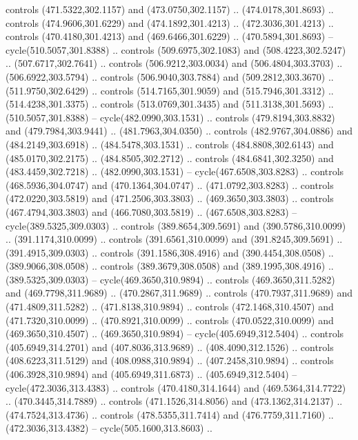 \begin{scope}[cm={{1.25,0.0,0.0,-1.25,(0.0,743.43331)}}]
    controls (471.5322,302.1157) and (473.0750,302.1157) .. (474.0178,301.8693) ..
    controls (474.9606,301.6229) and (474.1892,301.4213) .. (472.3036,301.4213) ..
    controls (470.4180,301.4213) and (469.6466,301.6229) .. (470.5894,301.8693) --
    cycle(510.5057,301.8388) .. controls (509.6975,302.1083) and
    (508.4223,302.5247) .. (507.6717,302.7641) .. controls (506.9212,303.0034) and
    (506.4804,303.3703) .. (506.6922,303.5794) .. controls (506.9040,303.7884) and
    (509.2812,303.3670) .. (511.9750,302.6429) .. controls (514.7165,301.9059) and
    (515.7946,301.3312) .. (514.4238,301.3375) .. controls (513.0769,301.3435) and
    (511.3138,301.5693) .. (510.5057,301.8388) -- cycle(482.0990,303.1531) ..
    controls (479.8194,303.8832) and (479.7984,303.9441) .. (481.7963,304.0350) ..
    controls (482.9767,304.0886) and (484.2149,303.6918) .. (484.5478,303.1531) ..
    controls (484.8808,302.6143) and (485.0170,302.2175) .. (484.8505,302.2712) ..
    controls (484.6841,302.3250) and (483.4459,302.7218) .. (482.0990,303.1531) --
    cycle(467.6508,303.8283) .. controls (468.5936,304.0747) and
    (470.1364,304.0747) .. (471.0792,303.8283) .. controls (472.0220,303.5819) and
    (471.2506,303.3803) .. (469.3650,303.3803) .. controls (467.4794,303.3803) and
    (466.7080,303.5819) .. (467.6508,303.8283) -- cycle(389.5325,309.0303) ..
    controls (389.8654,309.5691) and (390.5786,310.0099) .. (391.1174,310.0099) ..
    controls (391.6561,310.0099) and (391.8245,309.5691) .. (391.4915,309.0303) ..
    controls (391.1586,308.4916) and (390.4454,308.0508) .. (389.9066,308.0508) ..
    controls (389.3679,308.0508) and (389.1995,308.4916) .. (389.5325,309.0303) --
    cycle(469.3650,310.9894) .. controls (469.3650,311.5282) and
    (469.7798,311.9689) .. (470.2867,311.9689) .. controls (470.7937,311.9689) and
    (471.4809,311.5282) .. (471.8138,310.9894) .. controls (472.1468,310.4507) and
    (471.7320,310.0099) .. (470.8921,310.0099) .. controls (470.0522,310.0099) and
    (469.3650,310.4507) .. (469.3650,310.9894) -- cycle(405.6949,312.5404) ..
    controls (405.6949,314.2701) and (407.8036,313.9689) .. (408.4090,312.1526) ..
    controls (408.6223,311.5129) and (408.0988,310.9894) .. (407.2458,310.9894) ..
    controls (406.3928,310.9894) and (405.6949,311.6873) .. (405.6949,312.5404) --
    cycle(472.3036,313.4383) .. controls (470.4180,314.1644) and
    (469.5364,314.7722) .. (470.3445,314.7889) .. controls (471.1526,314.8056) and
    (473.1362,314.2137) .. (474.7524,313.4736) .. controls (478.5355,311.7414) and
    (476.7759,311.7160) .. (472.3036,313.4382) -- cycle(505.1600,313.8603) ..

\end{scope}
